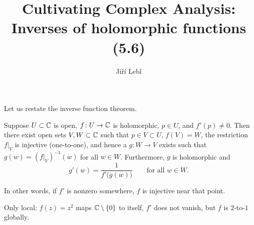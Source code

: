 \documentclass[10pt,aspectratio=169]{beamer}
\author{Ji\v{r}\'i Lebl}
\institute[OSU]{%
Departemento pri Matematiko de Oklahoma {\^S}tata Universitato}
\title{Cultivating Complex Analysis:\\%
Inverses of holomorphic functions (5.6)}
\date{}
\begin{document}
\begin{frame}
\titlepage
\end{frame}

\begin{frame}
Let us restate the inverse function theorem.

\begin{theorem}
Suppose $U \subset {\mathbb{C}}$ is open, $f \colon U \to {\mathbb{C}}$ is holomorphic,
$p \in U$, and $f'(p) \not= 0$.  
Then there exist open sets $V, W \subset {\mathbb{C}}$ such that
$p \in V \subset U$, $f(V) = W$, the restriction $f|_V$ is injective
(one-to-one),
and hence a $g \colon W \to V$ exists such that
$g(w) = (f|_V)^{-1}(w)$ for all $w \in W$.
Furthermore, $g$ is holomorphic and
\begin{equation*}
g'(w) = \frac{1}{f'\bigl(g(w)\bigr)} \qquad \text{for all $w \in W$}.
\end{equation*}
\end{theorem}

\pause
\medskip

In other words, if $f'$ is nonzero somewhere, $f$ is injective near that
point.

\pause
\medskip

Only local: $f(z) = z^2$ maps ${\mathbb{C}} \setminus \{ 0 \}$
to itself, $f'$ does not vanish, but $f$ is $2$-to-$1$ globally.
\end{frame}
\end{document}
